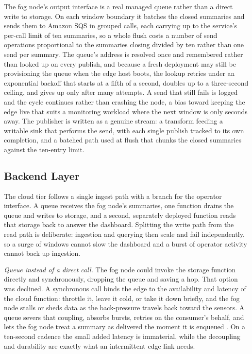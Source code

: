 \documentclass[conference]{IEEEtran}
\begin{document}
The fog node's output interface is a real managed queue rather than a direct write to storage. On each window boundary it batches the closed summaries and sends them to Amazon SQS in grouped calls, each carrying up to the service's per-call limit of ten summaries, so a whole flush costs a number of send operations proportional to the summaries closing divided by ten rather than one send per summary. The queue's address is resolved once and remembered rather than looked up on every publish, and because a fresh deployment may still be provisioning the queue when the edge host boots, the lookup retries under an exponential backoff that starts at a fifth of a second, doubles up to a three-second ceiling, and gives up only after many attempts. A send that still fails is logged and the cycle continues rather than crashing the node, a bias toward keeping the edge live that suits a monitoring workload where the next window is only seconds away. The publisher is written as a genuine stream: a transform feeding a writable sink that performs the send, with each single publish tracked to its own completion, and a batched path used at flush that chunks the closed summaries against the ten-entry limit.

\subsection{Backend Layer}

The cloud tier follows a single ingest path with a branch for the operator interface. A queue receives the fog node's summaries, one function drains the queue and writes to storage, and a second, separately deployed function reads that storage back to answer the dashboard. Splitting the write path from the read path is deliberate: ingestion and querying then scale and fail independently, so a surge of windows cannot slow the dashboard and a burst of operator activity cannot back up ingestion.

\textit{Queue instead of a direct call.} The fog node could invoke the storage function directly and synchronously, dropping the queue and saving a hop. That option was declined. A synchronous call binds the edge to the availability and latency of the cloud function: throttle it, leave it cold, or take it down briefly, and the fog node stalls or sheds data as the back-pressure travels back toward the sensors. A queue severs that coupling, absorbs bursts, retries on the consumer's behalf, and lets the fog node treat a summary as delivered the moment it is enqueued \cite{hohpe2003}. On a ten-second cadence the small added latency is immaterial, while the decoupling and durability are exactly what an intermittent edge link needs.
\end{document}
